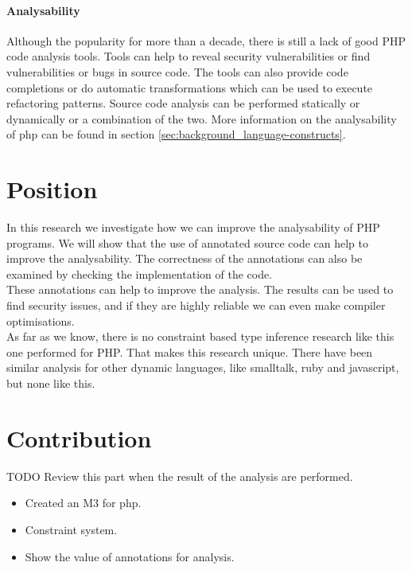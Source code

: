 \documentclass[../main.tex]{subfiles}
\begin{document}
        \paragraph{Analysability}
        Although the popularity for more than a decade, there is still a lack of good PHP code analysis tools.
        Tools can help to reveal security vulnerabilities or find vulnerabilities or bugs in source code.
        The tools can also provide code completions or do automatic transformations which can be used to execute refactoring patterns.
        Source code analysis can be performed statically or dynamically or a combination of the two.
        More information on the analysability of php can be found in section \ref{sec:background_language-constructs}.
        
    \section{Position} %
        In this research we investigate how we can improve the analysability of PHP programs.
        We will show that the use of annotated source code can help to improve the analysability.
        The correctness of the annotations can also be examined by checking the implementation of the code. 
        \\
        These annotations can help to improve the analysis.
        The results can be used to find security issues, and if they are highly reliable we can even make compiler optimisations.
        \\
        As far as we know, there is no constraint based type inference research like this one performed for PHP.
        That makes this research unique.
        There have been similar analysis for other dynamic languages, like smalltalk, ruby and javascript, but none like this.
       
    \section{Contribution} %
        TODO Review this part when the result of the analysis are performed.
        \begin{itemize}
            \item Created an M3 for php.
            \item Constraint system.
            \item Show the value of annotations for analysis.
        \end{itemize}
\end{document}
